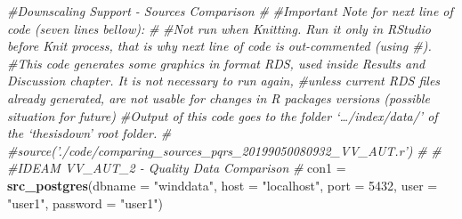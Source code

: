 \documentclass[12pt,twoside]{reedthesis}
\newenvironment{Shaded}{\begin{snugshade}}{\end{snugshade}}
\newcommand{\CommentTok}[1]{\textcolor[rgb]{0.56,0.35,0.01}{\textit{#1}}}
\newcommand{\DataTypeTok}[1]{\textcolor[rgb]{0.13,0.29,0.53}{#1}}
\newcommand{\DecValTok}[1]{\textcolor[rgb]{0.00,0.00,0.81}{#1}}
\newcommand{\KeywordTok}[1]{\textcolor[rgb]{0.13,0.29,0.53}{\textbf{#1}}}
\newcommand{\NormalTok}[1]{#1}
\newcommand{\StringTok}[1]{\textcolor[rgb]{0.31,0.60,0.02}{#1}}
\begin{document}
\vspace{0.4cm}
\begin{Shaded}
\begin{Highlighting}[]
\CommentTok{#Downscaling Support - Sources Comparison}
\CommentTok{#}
\CommentTok{#Important Note for next line of code (seven lines bellow):}
\CommentTok{#}
\CommentTok{#Not run when Knitting. Run it only in RStudio before Knit process, that is why next line of code is out-commented (using #). }
\CommentTok{#This code generates some graphics in format RDS, used inside Results and Discussion chapter. It is not necessary to run again, }
\CommentTok{#unless current RDS files already generated, are not usable for changes in R packages versions (possible situation for future)}
\CommentTok{#Output of this code goes to the folder ‘…/index/data/’ of the ‘thesisdown’ root folder.}
\CommentTok{#}
\CommentTok{#source('./code/comparing_sources_pqrs_20199050080932_VV_AUT.r')}
\CommentTok{#}
\CommentTok{#}
\CommentTok{#IDEAM VV_AUT_2 - Quality Data Comparison}
\CommentTok{#}
\NormalTok{con1 =}\StringTok{ }\KeywordTok{src_postgres}\NormalTok{(}\DataTypeTok{dbname =} \StringTok{"winddata"}\NormalTok{, }\DataTypeTok{host =} \StringTok{"localhost"}\NormalTok{, }\DataTypeTok{port =} \DecValTok{5432}\NormalTok{, }\DataTypeTok{user =} \StringTok{"user1"}\NormalTok{, }\DataTypeTok{password =} \StringTok{"user1"}\NormalTok{)}


\end{Highlighting}
\end{Shaded}
\end{document}
